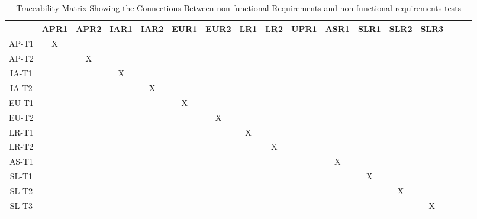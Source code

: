 \documentclass[12pt, oneside, openany, titlepage]{article}
\begin{document}
\begin{landscape}
\begin{table}[h!]
\centering
\begin{tabular}{|c|c|c|c|c|c|c|c|c|c|c|c|c|c|c|c|c|}
\hline
	& APR1 & APR2 & IAR1 & IAR2 & EUR1 & EUR2 & LR1 & LR2 & UPR1 & ASR1 & SLR1 & SLR2 & SLR3\\
\hline
AP-T1        &X & & & & & & & & & & & & \\ \hline
AP-T2        & &X & & & & & & & & & & & \\ \hline
IA-T1        & & &X & & & & & & & & & & \\ \hline
IA-T2        & & & &X & & & & & & & & & \\ \hline
EU-T1        & & & & &X & & & & & & & & \\ \hline
EU-T2        & & & & & &X & & & & & & & \\ \hline
LR-T1        & & & & & & &X & & & & & & \\ \hline
LR-T2        & & & & & & & &X & & & & & \\ \hline
AS-T1        & & & & & & & & & &X & & & \\ \hline
SL-T1        & & & & & & & & & & &X & & \\ \hline
SL-T2        & & & & & & & & & & & &X & \\ \hline
SL-T3        & & & & & & & & & & & & &X \\ \hline

\end{tabular}
\caption{Traceability Matrix Showing the Connections Between non-functional Requirements and non-functional requirements tests}
\label{Table:A_trace}
\end{table}
\end{landscape}
\end{document}
